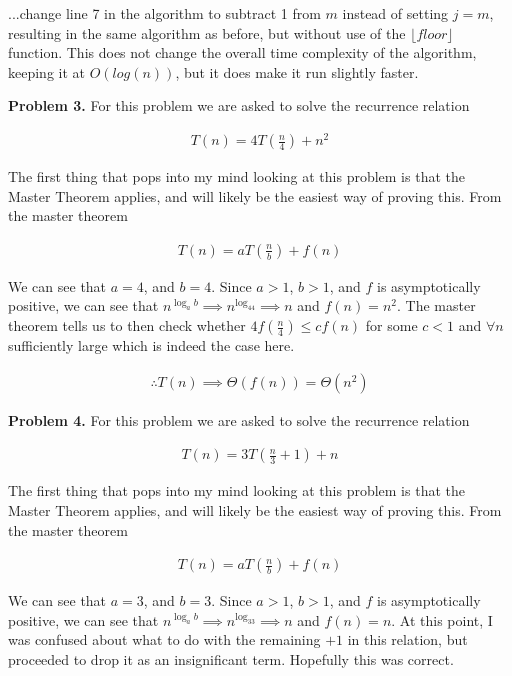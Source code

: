 \documentclass{article}
\begin{document}
...change line 7 in the algorithm to subtract 1 from $m$ instead of setting $j = m$, resulting in the same algorithm as before, but without use of the $\lfloor floor \rfloor$ function. This does not change the overall time complexity of the algorithm, keeping it at $O(log(n))$, but it does make it run slightly faster. 

\hfill

\textbf{Problem 3.} For this problem we are asked to solve the recurrence relation

\begin{gather}
    T(n) = 4T(\frac{n}{4}) + n^2
\end{gather}

The first thing that pops into my mind looking at this problem is that the Master Theorem applies, and will likely be the easiest way of proving this. From the master theorem

\begin{gather}
    T(n) = aT(\frac{n}{b}) + f(n)
\end{gather}


We can see that $a = 4$, and $b = 4$. Since $a > 1$, $b > 1$, and $f$ is asymptotically positive, we can see that $n^{\log_ab} \implies n^{\log_44} \implies n$ and $f(n) = n^2$. The master theorem tells us to then check whether $4f(\frac{n}{4}) \leq cf(n)$ for some $c < 1$ and $\forall n$ sufficiently large which is indeed the case here.

\begin{gather}
    \therefore T(n) \implies \Theta(f(n)) = \Theta(n^2)
\end{gather}

\hfill

\textbf{Problem 4.} For this problem we are asked to solve the recurrence relation

\begin{gather}
    T(n) = 3T(\frac{n}{3} + 1) + n
\end{gather}

The first thing that pops into my mind looking at this problem is that the Master Theorem applies, and will likely be the easiest way of proving this. From the master theorem

\begin{gather}
    T(n) = aT(\frac{n}{b}) + f(n)
\end{gather}


We can see that $a = 3$, and $b = 3$. Since $a > 1$, $b > 1$, and $f$ is asymptotically positive, we can see that $n^{\log_ab} \implies n^{\log_33} \implies n$ and $f(n) = n$. At this point, I was confused about what to do with the remaining $+1$ in this relation, but proceeded to drop it as an insignificant term. Hopefully this was correct.
\end{document}

